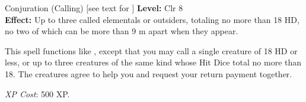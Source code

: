{Conjuration (Calling) [see text for ]}
{
	\textbf{Level:}
	Clr 8\\
	\textbf{Effect:}
	Up to three called elementals or outsiders, totaling no more than 18 HD, no two of which can be more than 9 m apart when they appear.\\
}
{
	This spell functions like , except that you may call a single creature of 18 HD or less, or up to three creatures of the same kind whose Hit Dice total no more than 18. The creatures agree to help you and request your return payment together.

	\textit{XP Cost}:
	500 XP.

}
